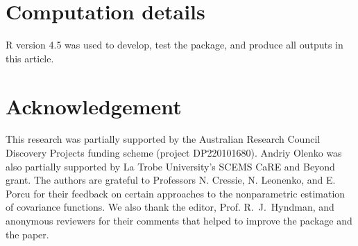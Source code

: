 \section{Computation details}\label{computation-details}

R version 4.5 was used to develop, test the package, and produce all
outputs in this article.

\section{Acknowledgement}\label{acknowledgement}

This research was partially supported by the Australian Research Council
Discovery Projects funding scheme (project DP220101680). Andriy Olenko
was also partially supported by La Trobe University's SCEMS CaRE and
Beyond grant. The authors are grateful to Professors N. Cressie, N.
Leonenko, and E. Porcu for their feedback on certain approaches to the
nonparametric estimation of covariance functions. We also thank the
editor, Prof. R.~J.~Hyndman, and anonymous reviewers for their comments
that helped to improve the package and the paper.

\address{Adam Bilchouris\\
Department of Mathematics and Statistics\\
La Trobe University\\
Australia\\
ORCiD: 0009-0002-4649-0247\\
}
\address{Andriy Olenko\\
Department of Mathematics and Statistics\\
La Trobe University\\
Australia\\
ORCiD: 0000-0002-0917-7000\\
}

